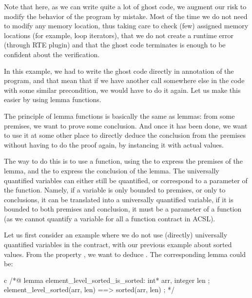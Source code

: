 Note that here, as we can write quite a lot of ghost code, we augment our risk
to modify the behavior of the program by mistake. Most of the time we do not
need to modify any memory location, thus taking care to check (few) assigned
memory locations (for example, loop iterators), that we do not create a runtime
error (through RTE plugin) and that the ghost code terminates is enough to be
confident about the verification.



In this example, we had to write the ghost code directly in annotation of the
program, and that mean that if we have another call somewhere else in the code
with some similar precondition, we would have to do it again. Let us make this
easier by using lemma functions.






The principle of lemma functions is basically the same as lemmas: from some
premises, we want to prove some conclusion. And once it has been done, we want
to use it at some other place to directly deduce the conclusion from the
premises without having to do the proof again, by instancing it with actual
values.



The way to do this is to use a function, using the  to
express the premises of the lemma, and the  to express the
conclusion of the lemma. The universally quantified variables can either still
be quantified, or correspond to a parameter of the function. Namely, if a
variable is only bounded to premises, or only to conclusions, it can be
translated into a universally quantified variable, if it is bounded to both
premises and conclusion, it must be a parameter of a function (as we cannot
quantify a variable for all a function contract in ACSL).



Let us first consider an example where we do not use (directly) universally
quantified variables in the contract, with our previous example about sorted
values. From the property , we
want to deduce . The corresponding lemma could be:


\begin{CodeBlock}{c}
/*@
  lemma element_level_sorted_is_sorted:
    \forall int* arr, integer len ;
       element_level_sorted(arr, len) ==> sorted(arr, len) ;
*/
\end{CodeBlock}


